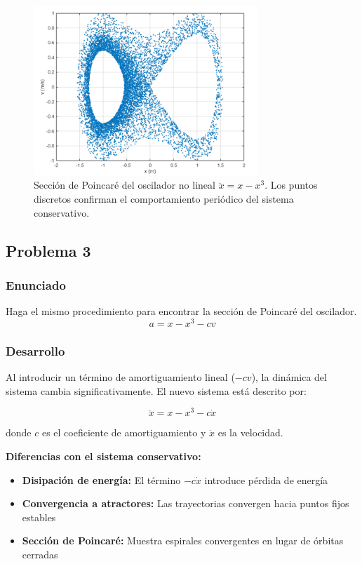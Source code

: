 \documentclass[a4paper,12pt]{article}
\theoremstyle{mytheor}
\begin{document}
\begin{figure}[H]
    \centering
    \includegraphics[width=0.75\textwidth]{g9.png}
    \caption{Sección de Poincaré del oscilador no lineal $\ddot{x} = x - x^3$. Los puntos discretos confirman el comportamiento periódico del sistema conservativo.}
    \label{fig:seccion_poincare_oscilador} 
\end{figure}




\subsection{Problema 3}
\subsubsection{Enunciado}
 Haga el mismo procedimiento para encontrar la sección de Poincaré del oscilador.
\begin{equation}
a = x - x^3 - cv
\end{equation}
\subsubsection{Desarrollo}

Al introducir un término de amortiguamiento lineal ($-cv$), la dinámica del sistema cambia significativamente. El nuevo sistema está descrito por:

\begin{equation}
\ddot{x} = x - x^3 - c\dot{x}
\end{equation}

donde $c$ es el coeficiente de amortiguamiento y $\dot{x}$ es la velocidad.

\textbf{Diferencias con el sistema conservativo:}
\begin{itemize}
    \item \textbf{Disipación de energía:} El término $-c\dot{x}$ introduce pérdida de energía
    \item \textbf{Convergencia a atractores:} Las trayectorias convergen hacia puntos fijos estables
    \item \textbf{Sección de Poincaré:} Muestra espirales convergentes en lugar de órbitas cerradas
\end{itemize}
\end{document}
